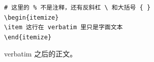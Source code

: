 \documentclass{article}
\begin{document}
\begin{verbatim}
# 这里的 % 不是注释，还有反斜杠 \ 和大括号 { }
\begin{itemize}
\item 这行在 verbatim 里只是字面文本
\end{itemize}
\end{verbatim}
verbatim 之后的正文。
\end{document}
